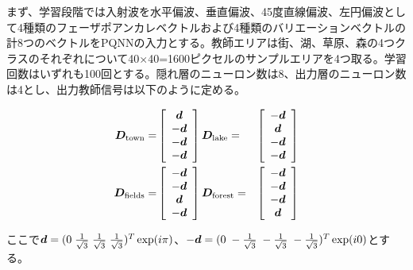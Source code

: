 \documentclass[a4j, twocolumn]{jsarticle}
\begin{document}
まず、学習段階では入射波を水平偏波、垂直偏波、45度直線偏波、左円偏波として4種類のフェーザポアンカレベクトルおよび4種類のバリエーションベクトルの計8つのベクトルをPQNNの入力とする。教師エリアは街、湖、草原、森の4つクラスのそれぞれについて40$\times$40=1600ピクセルのサンプルエリアを4つ取る。学習回数はいずれも100回とする。隠れ層のニューロン数は8、出力層のニューロン数は4とし、出力教師信号は以下のように定める。
\begin{small}
	\begin{align}\label{dvalue_new}
	\begin{aligned}
	\boldsymbol{D}_{\rm town}=&
	\left[\begin{array}{c} 
	\mbox{\boldmath $d$}\\
	-\mbox{\boldmath $d$}\\
	-\mbox{\boldmath $d$}\\
	-\mbox{\boldmath $d$}
	\end{array}\right]
	\boldsymbol{D}_{\rm lake}=&
	\left[\begin{array}{c} 
	-\mbox{\boldmath $d$}\\
	\mbox{\boldmath $d$}\\
	-\mbox{\boldmath $d$}\\
	-\mbox{\boldmath $d$}
	\end{array}\right]\\
	\boldsymbol{D}_{\rm fields}=&
	\left[\begin{array}{c} 
	-\mbox{\boldmath $d$}\\ 
	-\mbox{\boldmath $d$}\\ 
	\mbox{\boldmath $d$}\\
	-\mbox{\boldmath $d$}
	\end{array}\right]
	\boldsymbol{D}_{\rm forest}=&
	\left[\begin{array}{c}
	-\mbox{\boldmath $d$}\\
	-\mbox{\boldmath $d$}\\
	-\mbox{\boldmath $d$}\\
	\mbox{\boldmath $d$}
	\end{array}\right]
	\end{aligned}
	\end{align}
\end{small}
ここで$\mbox{\boldmath $d$} = (0 \; \frac{1}{\sqrt{3}} \; \frac{1}{\sqrt{3}} \; \frac{1}{\sqrt{3}})^{T}\exp(i\pi)$、$-\mbox{\boldmath $d$} = (0 \; -\frac{1}{\sqrt{3}} \; -\frac{1}{\sqrt{3}} \; -\frac{1}{\sqrt{3}})^{T}\exp(i0)$とする。
\end{document}
